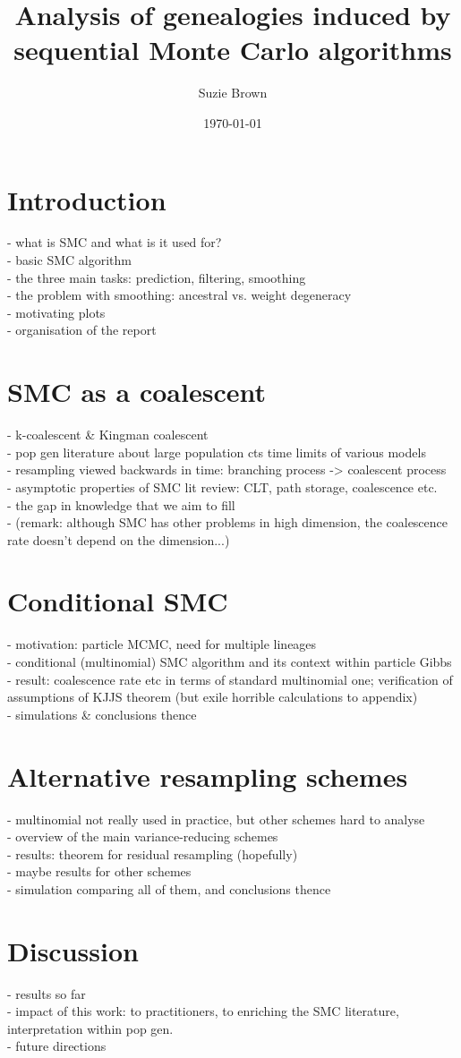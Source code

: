 \documentclass[fleqn]{article}
\title{Analysis of genealogies induced by sequential Monte Carlo algorithms}
\author{Suzie Brown}
\date{\today}
\begin{document}
\maketitle
\thispagestyle{fancy}

\section{Introduction}
- what is SMC and what is it used for?\\
- basic SMC algorithm\\
- the three main tasks: prediction, filtering, smoothing\\
- the problem with smoothing: ancestral vs. weight degeneracy\\
- motivating plots\\
- organisation of the report

\section{SMC as a coalescent}
- k-coalescent \& Kingman coalescent\\
- pop gen literature about large population cts time limits of various models\\
- resampling viewed backwards in time: branching process -> coalescent process\\
- asymptotic properties of SMC lit review: CLT, path storage, coalescence etc.\\
- the gap in knowledge that we aim to fill\\
- (remark: although SMC has other problems in high dimension, the coalescence rate doesn't depend on the dimension...)

\section{Conditional SMC}
- motivation: particle MCMC, need for multiple lineages\\
- conditional (multinomial) SMC algorithm and its context within particle Gibbs\\
- result: coalescence rate etc in terms of standard multinomial one; verification of assumptions of KJJS theorem (but exile horrible calculations to appendix)\\
- simulations \& conclusions thence

\section{Alternative resampling schemes}
- multinomial not really used in practice, but other schemes hard to analyse\\
- overview of the main variance-reducing schemes\\
- results: theorem for residual resampling (hopefully)\\
- maybe results for other schemes\\
- simulation comparing all of them, and conclusions thence\\

\section{Discussion}
- results so far\\
- impact of this work: to practitioners, to enriching the SMC literature, interpretation within pop gen.\\
- future directions



\end{document}
